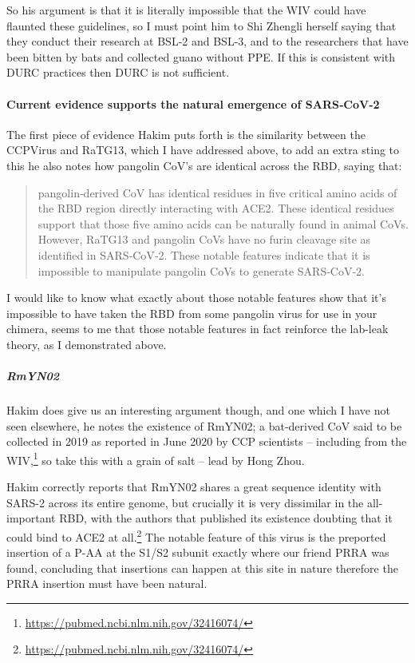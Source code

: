 \documentclass[11pt]{article}
\begin{document}
So his argument is that it is literally impossible that the WIV could have flaunted these guidelines, so I must point him to Shi Zhengli herself saying that they conduct their research at BSL-2 and BSL-3, and to the researchers that have been bitten by bats and collected guano without PPE. If this is consistent with DURC practices then DURC is not sufficient.

\paragraph{Current evidence supports the natural emergence of SARS‐CoV‐2}
\label{sec:orgb0a8125}
The first piece of evidence Hakim puts forth is the similarity between the CCPVirus and RaTG13, which I have addressed above, to add an extra sting to this he also notes how pangolin CoV's are identical across the RBD, saying that:
\begin{quote}
pangolin‐derived CoV has identical residues in five critical amino acids of the RBD region directly interacting with ACE2. These identical residues support that those five amino acids can be naturally found in animal CoVs. However, RaTG13 and pangolin CoVs have no furin cleavage site as identified in SARS‐CoV‐2. These notable features indicate that it is impossible to manipulate pangolin CoVs to generate SARS‐CoV‐2.
\end{quote}

I would like to know what exactly about those notable features show that it's impossible to have taken the RBD from some pangolin virus for use in your chimera, seems to me that those notable features in fact reinforce the lab-leak theory, as I demonstrated above.

\subparagraph{RmYN02}
\label{sec:org702e275}
Hakim does give us an interesting argument though, and one which I have not seen elsewhere, he notes the existence of RmYN02; a bat-derived CoV said to be collected in 2019 as reported in June 2020 by CCP scientists -- including from the WIV,\footnote{\url{https://pubmed.ncbi.nlm.nih.gov/32416074/}} so take this with a grain of salt -- lead by Hong Zhou.

Hakim correctly reports that RmYN02 shares a great sequence identity with SARS-2 across its entire genome, but crucially it is very dissimilar in the all-important RBD, with the authors that published its existence doubting that it could bind to ACE2 at all.\footnote{\url{https://pubmed.ncbi.nlm.nih.gov/32416074/}} The notable feature of this virus is the preported insertion of a P-AA at the S1/S2 subunit exactly where our friend PRRA was found, concluding that insertions can happen at this site in nature therefore the PRRA insertion must have been natural.
\end{document}
